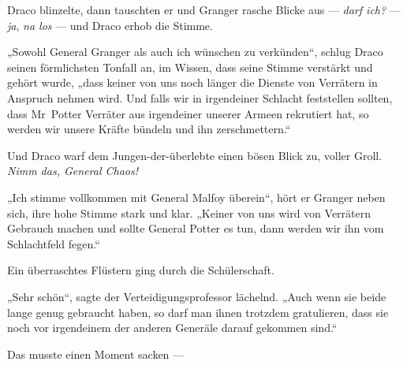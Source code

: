 Draco blinzelte, dann tauschten er und Granger rasche Blicke aus — \emph{darf ich?} — \emph{ja}, \emph{na los} — und Draco erhob die Stimme.

„Sowohl General Granger als auch ich wünschen zu verkünden“, schlug Draco seinen förmlichsten Tonfall an, im Wissen, dass seine Stimme verstärkt und gehört wurde, „dass keiner von uns noch länger die Dienste von Verrätern in Anspruch nehmen wird. Und falls wir in irgendeiner Schlacht feststellen sollten, dass Mr~Potter Verräter aus irgendeiner unserer Armeen rekrutiert hat, so werden wir unsere Kräfte bündeln und ihn zerschmettern.“

Und Draco warf dem Jungen-der-überlebte einen bösen Blick zu, voller Groll. \emph{Nimm das, General Chaos!}

„Ich stimme vollkommen mit General Malfoy überein“, hört er Granger neben sich, ihre hohe Stimme stark und klar.
„Keiner von uns wird von Verrätern Gebrauch machen und sollte General Potter es tun, dann werden wir ihn vom Schlachtfeld fegen.“

Ein überraschtes Flüstern ging durch die Schülerschaft.

„Sehr schön“, sagte der Verteidigungsprofessor lächelnd.
„Auch wenn sie beide lange genug gebraucht haben, so darf man ihnen trotzdem gratulieren, dass sie noch vor irgendeinem der anderen Generäle darauf gekommen sind.“

Das musste einen Moment sacken —

